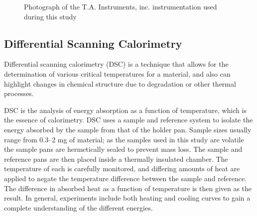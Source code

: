 \begin{figure}[htbp]
   \centering
   \caption[T.A. Instruments, inc. Instrumentation]%
   		{Photograph of the T.A. Instruments, inc. instrumentation used during this study}
   \label{fig:TA-Instruments}
\end{figure}


\subsection{Differential Scanning Calorimetry}
	
Differential scanning calorimetry (DSC) is a technique that allows for the determination of various critical temperatures for a material, and also can highlight changes in chemical structure due to degradation or other thermal processes. 

DSC is the analysis of energy absorption as a function of temperature, which is the essence of calorimetry. DSC uses a sample and reference system to isolate the energy absorbed by the sample from that of the holder pan. Sample sizes usually range from 0.3--2 mg of material; as the samples used in this study are volatile the sample pans are hermetically sealed to prevent mass loss. The sample and reference pans are then placed inside a thermally insulated chamber. The temperature of each is carefully monitored, and differing amounts of heat are applied to negate the temperature difference between the sample and reference. The difference in absorbed heat as a function of temperature is then given as the result. In general, experiments include both heating and cooling curves to gain a complete understanding of the different energies. 
	
